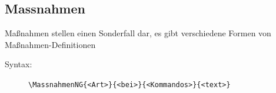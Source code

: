 \documentclass[
ngerman,
paper=a4,
asymmetric,
fontsize=10pt,
draft=false,
numbers=noenddot,
bibtotocnumbered,
footnotes=multiple,
toc=flat,
]{scrbook}
\begin{document}

\subsection{Massnahmen}

Maßnahmen stellen einen Sonderfall dar, es gibt verschiedene
Formen von Maßnahmen-Definitionen

\begin{description}
    \item[Syntax:] \lstinline$\MassnahmenNG{<Art>}{<bei>}{<Kommandos>}{<text>}$
%     
\end{description}

% 
% 
% 
% 
% 
% 
% 






\printindex
\end{document}
